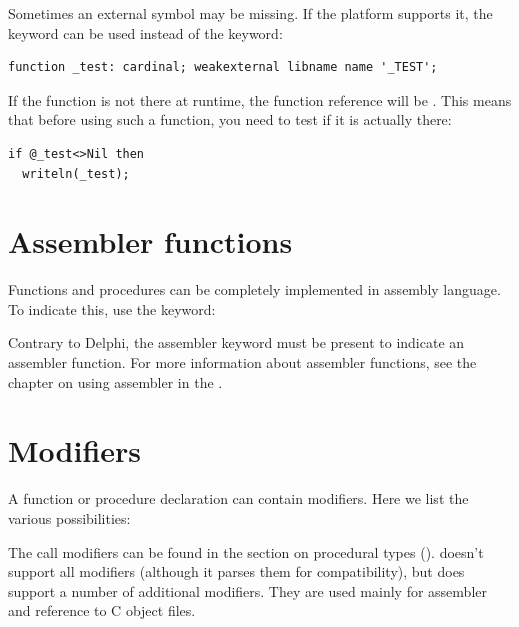 Sometimes an external symbol may be missing. If the platform supports it, the
 keyword can be used instead of the  keyword:
\begin{verbatim}
function _test: cardinal; weakexternal libname name '_TEST';
\end{verbatim}
If the function is not there at runtime, the function reference will be
. This means that before using such a function, you need to test
if it is actually there:
\begin{verbatim}
if @_test<>Nil then
  writeln(_test);
\end{verbatim}




\section{Assembler functions}
Functions and procedures can be completely implemented in assembly
language. To indicate this, use the  keyword:

Contrary to Delphi, the assembler keyword must be present to indicate an
assembler function.
For more information about assembler functions, see the chapter on using
assembler in the \progref.


\section{Modifiers}
A function or procedure declaration can contain modifiers. Here we list the
various possibilities:

The call modifiers can be found in the section on procedural types ().
\fpc doesn't support all \tp modifiers (although it parses them for
compatibility), but does support a number of additional modifiers.
They are used mainly for assembler and reference to C object files.


